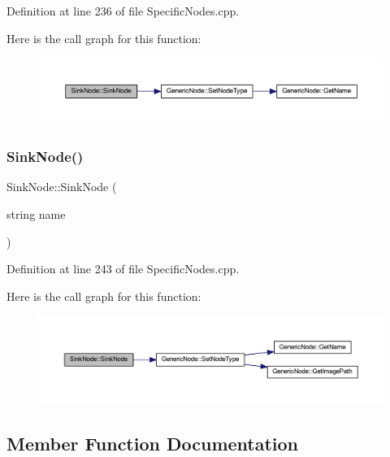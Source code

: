 Definition at line 236 of file Specific\+Nodes.\+cpp.

Here is the call graph for this function\+:
\nopagebreak
\begin{figure}[H]
\begin{center}
\leavevmode
\includegraphics[width=350pt]{class_sink_node_a098ae3f4e358acdfe3e3aa0906b41c60_cgraph}
\end{center}
\end{figure}
\mbox{\label{class_sink_node_a0c3227da9d4ca0757f3512e4473c9b5c}} 
\subsubsection{\texorpdfstring{Sink\+Node()}{SinkNode()}\hspace{0.1cm}{\footnotesize\ttfamily [2/2]}}
{\footnotesize\ttfamily Sink\+Node\+::\+Sink\+Node (\begin{DoxyParamCaption}\item[{string}]{name }\end{DoxyParamCaption})}



Definition at line 243 of file Specific\+Nodes.\+cpp.

Here is the call graph for this function\+:
\nopagebreak
\begin{figure}[H]
\begin{center}
\leavevmode
\includegraphics[width=350pt]{class_sink_node_a0c3227da9d4ca0757f3512e4473c9b5c_cgraph}
\end{center}
\end{figure}


\subsection{Member Function Documentation}
\mbox{\label{class_sink_node_ad6aeb0857d3ddd9511cd5d24974e1fac}} 
